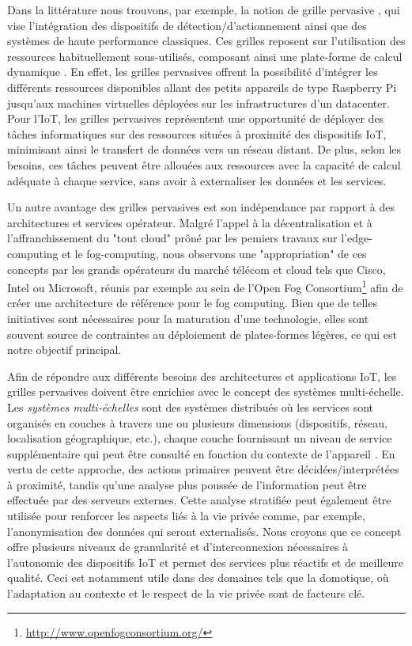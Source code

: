 Dans la littérature nous trouvons, par exemple, la notion de grille pervasive \cite{Parashar2010}, qui vise l'intégration des dispositifs de détection/d'actionnement ainsi que des systèmes de haute performance classiques. Ces grilles reposent sur l'utilisation des ressources habituellement sous-utilisés, composant ainsi une plate-forme de calcul dynamique \cite{Steffenel2015Roma}. En effet, les grilles pervasives offrent la possibilité d'intégrer les différents ressources disponibles allant des petits appareils de type Raspberry Pi jusqu'aux machines virtuelles déployées sur les infrastructures d'un datacenter. Pour l'IoT, les grilles pervasives représentent une opportunité de déployer des tâches informatiques sur des ressources situées à proximité des dispositifs IoT, minimisant ainsi le transfert de données vers un réseau distant. De plus, selon les besoins, ces tâches peuvent être allouées aux ressources avec la capacité de calcul adéquate à chaque service, sans avoir à externaliser les données et les services.

Un autre avantage des grilles pervasives est son indépendance par rapport à des architectures et services opérateur. Malgré l'appel à la décentralisation et à l'affranchissement du "tout cloud" prôné par les pemiers travaux sur l'edge-computing et le fog-computing, nous observons une "appropriation" de ces concepts par les grands opérateurs du marché télécom et cloud tels que Cisco, Intel ou Microsoft, réunis par exemple au sein de l'Open Fog Consortium\footnote{\url{http://www.openfogconsortium.org/}} afin de créer une architecture de référence pour le fog computing. Bien que de telles initiatives sont nécessaires pour la maturation d'une technologie, elles sont souvent source de contraintes au déploiement de plates-formes légères, ce qui est notre objectif principal.

Afin de répondre aux différents besoins des architectures et applications IoT, les grilles pervasives doivent être enrichies avec le concept des systèmes multi-échelle. Les \textit {systèmes multi-échelles} sont des systèmes distribués où les services sont organisés en couches à travers une ou plusieurs dimensions (dispositifs, réseau, localisation géographique, etc.), chaque couche fournissant un niveau de service supplémentaire qui peut être consulté en fonction du contexte de l'appareil \cite{Rottenberg2012,Rottenberg2014}.  En vertu de cette approche, des actions primaires peuvent être décidées/interprétées à proximité, tandis qu'une analyse plus poussée de l'information peut être effectuée par des serveurs externes. Cette analyse stratifiée peut également être utilisée pour renforcer les aspects liés à la vie privée comme, par exemple, l'anonymisation des données qui seront externalisés. Nous croyons que ce concept offre plusieurs niveaux de granularité et d'interconnexion nécessaires à l'autonomie des dispositifs IoT et permet des services plus réactifs et de meilleure qualité. Ceci est notamment utile dans des domaines tels que la domotique, où l'adaptation au contexte et le respect de la vie privée sont de facteurs clé.

